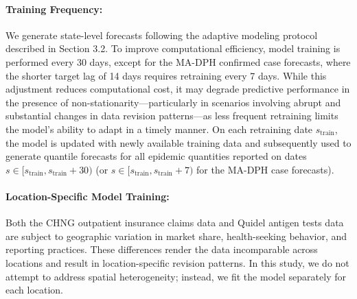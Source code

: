 \paragraph{Training Frequency:}
We generate state-level forecasts following the adaptive modeling protocol described in Section 3.2. To improve computational efficiency, model training is performed every 30 days, except for the MA-DPH confirmed case forecasts, where the shorter target lag of 14 days requires retraining every 7 days. While this adjustment reduces computational cost, it may degrade predictive performance in the presence of non-stationarity—particularly in scenarios involving abrupt and substantial changes in data revision patterns—as less frequent retraining limits the model's ability to adapt in a timely manner. On each retraining date \( s_{\text{train}} \), the model is updated with newly available training data and subsequently used to generate quantile forecasts for all epidemic quantities reported on dates \( s \in [s_{\text{train}}, s_{\text{train}}+30) \) (or \( s \in [s_{\text{train}}, s_{\text{train}}+7) \) for the MA-DPH case forecasts).




\paragraph{Location-Specific Model Training:}
Both the CHNG outpatient insurance claims data and Quidel antigen tests data are subject to geographic variation in market share, health-seeking behavior, and reporting practices. These differences render the data incomparable across locations and result in location-specific revision patterns. In this study, we do not attempt to address spatial heterogeneity; instead, we fit the model separately for each location.









